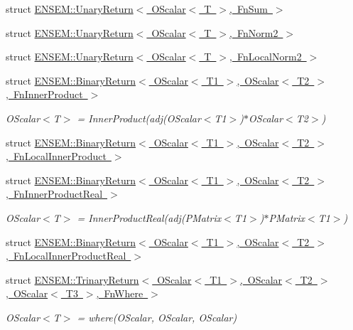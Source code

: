 \begin{DoxyCompactItemize}
struct \mbox{\hyperlink{structENSEM_1_1UnaryReturn_3_01OScalar_3_01T_01_4_00_01FnSum_01_4}{E\+N\+S\+E\+M\+::\+Unary\+Return$<$ O\+Scalar$<$ T $>$, Fn\+Sum $>$}}
\item 
struct \mbox{\hyperlink{structENSEM_1_1UnaryReturn_3_01OScalar_3_01T_01_4_00_01FnNorm2_01_4}{E\+N\+S\+E\+M\+::\+Unary\+Return$<$ O\+Scalar$<$ T $>$, Fn\+Norm2 $>$}}
\item 
struct \mbox{\hyperlink{structENSEM_1_1UnaryReturn_3_01OScalar_3_01T_01_4_00_01FnLocalNorm2_01_4}{E\+N\+S\+E\+M\+::\+Unary\+Return$<$ O\+Scalar$<$ T $>$, Fn\+Local\+Norm2 $>$}}
\item 
struct \mbox{\hyperlink{structENSEM_1_1BinaryReturn_3_01OScalar_3_01T1_01_4_00_01OScalar_3_01T2_01_4_00_01FnInnerProduct_01_4}{E\+N\+S\+E\+M\+::\+Binary\+Return$<$ O\+Scalar$<$ T1 $>$, O\+Scalar$<$ T2 $>$, Fn\+Inner\+Product $>$}}
\begin{DoxyCompactList}\small\item\em O\+Scalar$<$\+T$>$ = Inner\+Product(adj(\+O\+Scalar$<$\+T1$>$)$\ast$\+O\+Scalar$<$\+T2$>$) \end{DoxyCompactList}\item 
struct \mbox{\hyperlink{structENSEM_1_1BinaryReturn_3_01OScalar_3_01T1_01_4_00_01OScalar_3_01T2_01_4_00_01FnLocalInnerProduct_01_4}{E\+N\+S\+E\+M\+::\+Binary\+Return$<$ O\+Scalar$<$ T1 $>$, O\+Scalar$<$ T2 $>$, Fn\+Local\+Inner\+Product $>$}}
\item 
struct \mbox{\hyperlink{structENSEM_1_1BinaryReturn_3_01OScalar_3_01T1_01_4_00_01OScalar_3_01T2_01_4_00_01FnInnerProductReal_01_4}{E\+N\+S\+E\+M\+::\+Binary\+Return$<$ O\+Scalar$<$ T1 $>$, O\+Scalar$<$ T2 $>$, Fn\+Inner\+Product\+Real $>$}}
\begin{DoxyCompactList}\small\item\em O\+Scalar$<$\+T$>$ = Inner\+Product\+Real(adj(\+P\+Matrix$<$\+T1$>$)$\ast$\+P\+Matrix$<$\+T1$>$) \end{DoxyCompactList}\item 
struct \mbox{\hyperlink{structENSEM_1_1BinaryReturn_3_01OScalar_3_01T1_01_4_00_01OScalar_3_01T2_01_4_00_01FnLocalInnerProductReal_01_4}{E\+N\+S\+E\+M\+::\+Binary\+Return$<$ O\+Scalar$<$ T1 $>$, O\+Scalar$<$ T2 $>$, Fn\+Local\+Inner\+Product\+Real $>$}}
\item 
struct \mbox{\hyperlink{structENSEM_1_1TrinaryReturn_3_01OScalar_3_01T1_01_4_00_01OScalar_3_01T2_01_4_00_01OScalar_3_01T3_01_4_00_01FnWhere_01_4}{E\+N\+S\+E\+M\+::\+Trinary\+Return$<$ O\+Scalar$<$ T1 $>$, O\+Scalar$<$ T2 $>$, O\+Scalar$<$ T3 $>$, Fn\+Where $>$}}
\begin{DoxyCompactList}\small\item\em O\+Scalar$<$\+T$>$ = where(\+O\+Scalar, O\+Scalar, O\+Scalar) \end{DoxyCompactList}\end{DoxyCompactItemize}
